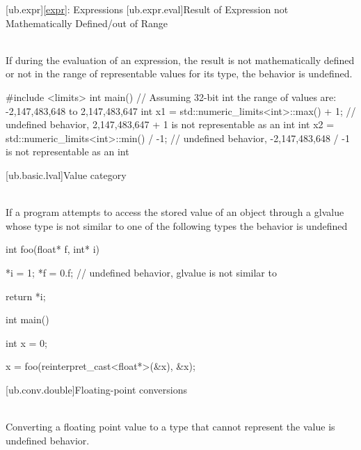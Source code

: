 \pnum
\begin{example}
\begin{codeblock}
\end{codeblock}
\end{example}


[ub.expr]{\ref{expr}: Expressions}
[ub.expr.eval]{Result of Expression not Mathematically Defined/out of Range}

\pnum
{} \\
If during the evaluation of an expression, the result is not mathematically defined or not in the range of
representable values for its type, the behavior is undefined.

\pnum
\begin{example}
\begin{codeblock}
#include <limits>
int main() {
  // Assuming 32-bit int the range of values are: -2,147,483,648 to 2,147,483,647
  int x1 = std::numeric_limits<int>::max() + 1;     // undefined behavior, 2,147,483,647 + 1 is not representable as an int
  int x2 = std::numeric_limits<int>::min() / -1;    // undefined behavior, -2,147,483,648 / -1 is not representable as an int
}
\end{codeblock}
\end{example}

[ub.basic.lval]{Value category}

\pnum
{} \\
If a program attempts to access  the stored value of an object through a glvalue whose type is not
similar  to one of the following types the behavior is undefined

\pnum
\begin{example}
\begin{codeblock}
int foo(float* f, int* i) {
  *i = 1;
  *f = 0.f;     // undefined behavior, glvalue is not similar to 

  return *i;
}

int main() {
  int x = 0;

  x = foo(reinterpret_cast<float*>(&x), &x);
}
\end{codeblock}
\end{example}


[ub.conv.double]{Floating-point conversions}

\pnum
{} \\
Converting a floating point value to a type that cannot represent the value is undefined behavior.

